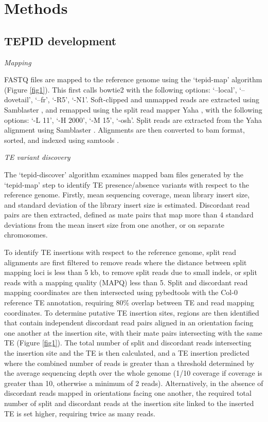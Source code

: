 \documentclass[12pt]{article}
\begin{document}
\section{Methods}

\subsection{TEPID development}

\emph{Mapping}

FASTQ files are mapped to the reference genome using the `tepid-map'
algorithm (Figure \ref{fig1}). This first calls bowtie2 \cite{Langmead:2012jh}
with the following options: `--local', `--dovetail', `--fr', `-R5',
`-N1'. Soft-clipped and unmapped reads are extracted using Samblaster
\cite{Faust:2014hf}, and remapped using the split read mapper Yaha
\cite{Faust:2012ic}, with the following options: `-L 11', `-H 2000', `-M
15', `-osh'. Split reads are extracted from the Yaha alignment using
Samblaster \cite{Faust:2014hf}. Alignments are then converted to bam
format, sorted, and indexed using samtools \cite{Li:2009ka}.

\emph{TE variant discovery}

The `tepid-discover' algorithm examines mapped bam files generated by
the `tepid-map' step to identify TE presence/absence variants with
respect to the reference genome. Firstly, mean sequencing coverage, mean
library insert size, and standard deviation of the library insert size
is estimated. Discordant read pairs are then extracted, defined as mate
pairs that map more than 4 standard deviations from the mean insert size
from one another, or on separate chromosomes.

To identify TE insertions with respect to the reference genome, split
read alignments are first filtered to remove reads where the distance
between split mapping loci is less than 5 kb, to remove split reads due
to small indels, or split reads with a mapping quality (MAPQ) less than
5. Split and discordant read mapping coordinates are then intersected
using pybedtools \cite{Dale:2011cl, Quinlan:2010km} with the Col-0
reference TE annotation, requiring 80\% overlap between TE and read
mapping coordinates. To determine putative TE insertion sites, regions
are then identified that contain independent discordant read pairs
aligned in an orientation facing one another at the insertion site, with
their mate pairs intersecting with the same TE (Figure \ref{fig1}). The total
number of split and discordant reads intersecting the insertion site and
the TE is then calculated, and a TE insertion predicted where the
combined number of reads is greater than a threshold determined by the
average sequencing depth over the whole genome (1/10 coverage if
coverage is greater than 10, otherwise a minimum of 2 reads).
Alternatively, in the absence of discordant reads mapped in orientations
facing one another, the required total number of split and discordant
reads at the insertion site linked to the inserted TE is set higher,
requiring twice as many reads.
\end{document}
